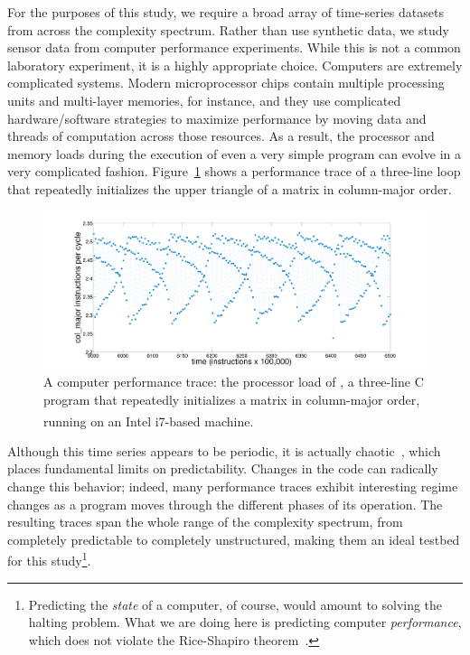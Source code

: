 For the purposes of this study, we require a broad array of
time-series datasets from across the complexity spectrum.  Rather than
use synthetic data, we study sensor data from computer performance
experiments.  While this is not a common laboratory experiment, it is
a highly appropriate choice.  Computers are extremely complicated
systems.  Modern microprocessor chips contain multiple processing
units and multi-layer memories, for instance, and they use complicated
hardware/software strategies to maximize performance by moving data
and threads of computation across those resources.  As a result, the
processor and memory loads during the execution of even a very simple
program can evolve in a very complicated fashion.
Figure~\ref{fig:col-ipc} shows a performance trace of a three-line
loop that repeatedly initializes the upper triangle of a matrix in
column-major order.
%
 \begin{figure}[htbp]
    \centering
    \includegraphics[width=\columnwidth]{figs/colshortts}
    \caption{A computer performance trace: the processor load of \col,
      a three-line C program that repeatedly initializes a matrix in
      column-major order, running on an Intel
      i7\textsuperscript{\textregistered}-based machine.}
   \label{fig:col-ipc}
  \end{figure}
%
Although this time series appears to be periodic, it is actually
chaotic~\cite{mytkowicz09}, which places fundamental limits on
predictability.  Changes in the code can radically change this
behavior; indeed, many performance traces exhibit interesting regime
changes as a program moves through the different phases of its
operation.  The resulting traces span the whole range of the
complexity spectrum, from completely predictable to completely
unstructured, making them an ideal testbed for this
study\footnote{Predicting the \emph{state} of a computer, of course,
  would amount to solving the halting problem.  What we are doing here
  is predicting computer \emph{performance}, which does not violate
  the Rice-Shapiro theorem~\cite{hopcroft2007}.}.

